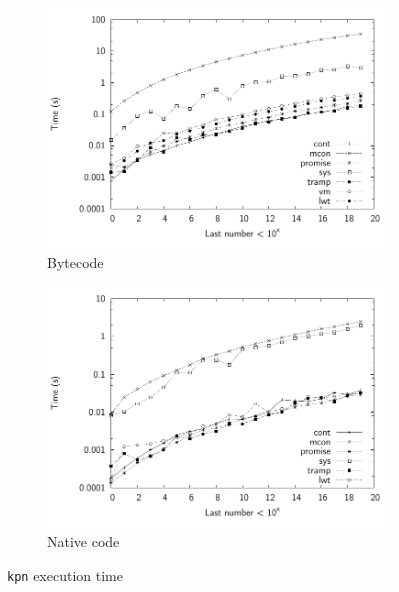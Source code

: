 \documentclass[12pt,twoside,notitlepage]{report}
\begin{document}
\begin{figure}[h]
\centering
\begin{subfigure}[b]{0.45\linewidth}
\includegraphics[width=\linewidth]{./kpn_exec_times_bw}
\caption{Bytecode}
\label{fig:kpn_exec_times_bc}
\end{subfigure}
\begin{subfigure}[b]{0.45\linewidth}
\includegraphics[width=\linewidth]{./kpn_exec_times_opt_bw}
\caption{Native code}
\label{fig:kpn_exec_times_nat}
\end{subfigure}
\cprotect\caption{\verb|kpn| execution time}
\label{fig:kpn_exec_times}
\end{figure}
\end{document}
